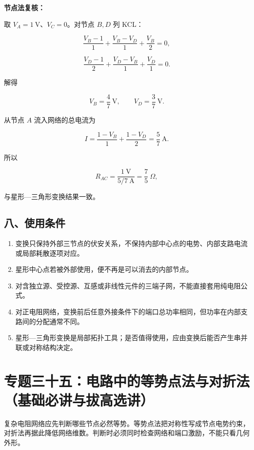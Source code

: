 \textbf{节点法复核：}

取 \(V_A=1\ \mathrm V\)、\(V_C=0\)。对节点 \(B,D\) 列 KCL：

\[
\frac{V_B-1}{1}
+\frac{V_B-V_D}{1}
+\frac{V_B}{2}=0,
\]

\[
\frac{V_D-1}{2}
+\frac{V_D-V_B}{1}
+\frac{V_D}{1}=0.
\]

解得

\[
V_B=\frac47\ \mathrm V,
\qquad
V_D=\frac37\ \mathrm V.
\]

从节点 \(A\) 流入网络的总电流为

\[
I
=\frac{1-V_B}{1}
+\frac{1-V_D}{2}
=\frac57\ \mathrm A.
\]

所以

\[
R_{AC}=\frac{1\ \mathrm V}{5/7\ \mathrm A}
=\frac75\ \Omega,
\]

与星形---三角形变换结果一致。

\subsection{八、使用条件}\label{m4:ux516bux4f7fux7528ux6761ux4ef6-1}

\begin{enumerate}
\def\labelenumi{\arabic{enumi}.}
\tightlist
\item
  变换只保持外部三节点的伏安关系，不保持内部中心点的电势、内部支路电流或局部耗散逐项对应。
\item
  星形中心点若被外部使用，便不再是可以消去的内部节点。
\item
  对含独立源、受控源、互感或非线性元件的三端子网，不能直接套用纯电阻公式。
\item
  对正电阻网络，变换前后任意外接条件下的端口总功率相同，但功率在内部支路间的分配通常不同。
\item
  星形---三角形变换是局部拓扑工具；是否值得使用，应由变换后能否产生串并联或对称结构决定。
\end{enumerate}

\section{专题三十五：电路中的等势点法与对折法（基础必讲与拔高选讲）}\label{m4:ux4e13ux9898ux4e09ux5341ux4e94ux7535ux8defux4e2dux7684ux7b49ux52bfux70b9ux6cd5ux4e0eux5bf9ux6298ux6cd5ux57faux7840ux5fc5ux8bb2ux4e0eux62d4ux9ad8ux9009ux8bb2}

复杂电阻网络应先判断哪些节点必然等势。等势点法把对称性写成节点电势约束，对折法再据此降低网络维数。判断时必须同时检查网络和端口激励，不能只看几何外形。

